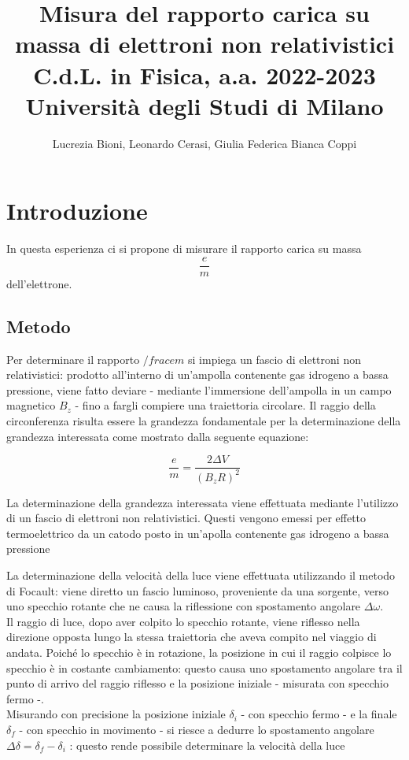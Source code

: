 \documentclass[]{article}
\title{%
    \Huge Misura del rapporto carica su massa di elettroni non relativistici \\
    \Large C.d.L. in Fisica, a.a. 2022-2023 \\ Università degli Studi di Milano}
\author{\LARGE Lucrezia Bioni, Leonardo Cerasi, Giulia Federica Bianca Coppi}
\date{}
\let\oldsection\section%
\renewcommand{\section}{%
	\renewcommand{\theequation}{\thesection.\arabic{equation}}%
	\oldsection}%
\let\oldsubsection\subsection%
\renewcommand{\subsection}{%
	\renewcommand{\theequation}{\thesubsection.\arabic{equation}}%
	\oldsubsection}%
\begin{document}
    \maketitle

    \section{Introduzione}

    In questa esperienza ci si propone di misurare il rapporto carica su massa $$ \frac{e}{m} $$ dell'elettrone.


    \subsection{Metodo}

    Per determinare il rapporto $ /frac{e}{m} $ si impiega un fascio di elettroni non relativistici: prodotto all'interno di un'ampolla contenente gas idrogeno a bassa pressione, viene fatto deviare - mediante l'immersione dell'ampolla in un campo magnetico $ B_z $ - fino a fargli compiere una traiettoria circolare. Il raggio della circonferenza risulta essere la grandezza fondamentale per la determinazione della grandezza interessata come mostrato dalla seguente equazione:

    \begin{equation}
        \label{e_m}
        \frac{e}{m} = \frac{2 \Delta V}{(B_z R)^2}
    \end{equation}

    La determinazione della grandezza interessata viene effettuata mediante l'utilizzo di un fascio di elettroni non relativistici. Questi vengono emessi per effetto termoelettrico da un catodo posto in un'apolla contenente gas idrogeno a bassa pressione 

    La determinazione della velocità della luce viene effettuata utilizzando il metodo di Focault: 
    viene diretto un fascio luminoso, proveniente da una sorgente, verso uno specchio rotante che ne causa
     la riflessione con spostamento angolare $    \Delta\omega  $.\\
     Il raggio di luce, dopo aver colpito lo specchio rotante, viene riflesso nella direzione opposta lungo 
     la stessa traiettoria che aveva compito nel viaggio di andata. Poiché lo specchio è in rotazione, 
     la posizione in cui il raggio colpisce lo specchio è in costante cambiamento: questo causa uno spostamento
      angolare tra il punto di arrivo del raggio riflesso e la posizione iniziale - misurata con specchio fermo -.\\
      Misurando con precisione la posizione iniziale $ \delta _i $ - con specchio fermo - e la finale  $ \delta _f $ - con specchio in movimento - 
      si riesce a dedurre lo spostamento angolare $ \Delta \delta = \delta_f - \delta_i $ : questo rende possibile determinare la velocità della luce 
\end{document}
